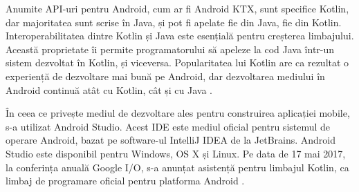 \documentclass[a4paper,12pt]{report}
\begin{document}
Anumite API-uri pentru Android, cum ar fi Android KTX, sunt specifice Kotlin,
dar majoritatea sunt scrise în Java, și pot fi apelate fie din Java, fie din Kotlin.
Interoperabilitatea dintre Kotlin și Java este esențială pentru creșterea 
limbajului. Această proprietate îi permite programatorului să 
apeleze la cod Java într-un sistem dezvoltat în Kotlin, și viceversa.
Popularitatea lui Kotlin are ca rezultat o experiență de dezvoltare mai bună 
pe Android, dar dezvoltarea mediului în Android continuă atât cu Kotlin, cât și 
cu Java \cite{WEBSITE:kotlin-overview}.

În ceea ce privește mediul de dezvoltare ales pentru construirea aplicației 
mobile, s-a utilizat Android Studio. Acest IDE este mediul oficial 
pentru sistemul de operare Android, bazat pe software-ul IntelliJ IDEA de la JetBrains. 
Android Studio este disponibil pentru Windows, 
OS X și Linux. Pe data de 17 mai 2017, la conferința anuală Google I/O, 
s-a anunțat asistență pentru limbajul Kotlin, 
ca limbaj de programare oficial pentru platforma Android \cite{WEBSITE:meet-android-studio}.
\end{document}
